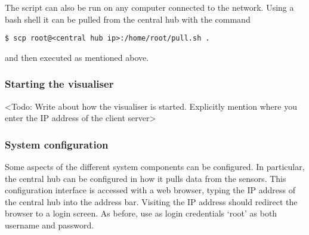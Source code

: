 \documentclass[../document.tex]{subfiles}
\begin{document}
The script can also be run on any computer connected to the network. Using a bash shell it can be pulled from the central hub with the command
\begin{lstlisting}
$ scp root@<central hub ip>:/home/root/pull.sh .
\end{lstlisting}
and then executed as mentioned above.

\subsubsection{Starting the visualiser}
{\color{red} <Todo: Write about how the visualiser is started. Explicitly mention where you enter the IP address of the client server>}


\subsubsection{System configuration}
Some aspects of the different system components can be configured. In particular, the central hub can be configured in how it pulls data from the sensors. This configuration interface is accessed with a web browser, typing the IP address of the central hub into the address bar. Visiting the IP address should redirect the browser to a login screen. As before, use as login credentials ‘root’ as both username and password.
\end{document}
